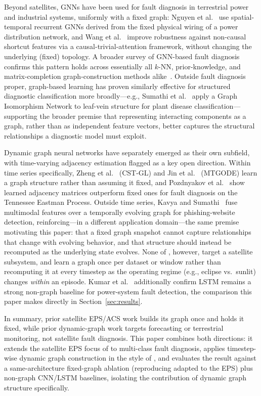 \documentclass[conference]{IEEEtran}
\begin{document}
Beyond satellites, GNNs have been used for fault diagnosis in terrestrial power and industrial
systems, uniformly with a fixed graph: Nguyen et al.~\cite{b6} use spatial-temporal recurrent
GNNs derived from the fixed physical wiring of a power distribution network, and Wang
et al.~\cite{b7} improve robustness against non-causal shortcut features via a
causal-trivial-attention framework, without changing the underlying (fixed) topology. A
broader survey of GNN-based fault diagnosis confirms this pattern holds across essentially all
$k$-NN, prior-knowledge, and matrix-completion graph-construction methods alike~\cite{b10}.
Outside fault
diagnosis proper, graph-based learning has proven similarly effective for structured
diagnostic classification more broadly---e.g., Sumathi et al.~\cite{b20} apply a Graph
Isomorphism Network to leaf-vein structure for plant disease classification---supporting the
broader premise that representing interacting components as a graph, rather than as
independent feature vectors, better captures the structural relationships a diagnostic model
must exploit.

Dynamic graph neural networks have separately emerged as their own subfield, with time-varying
adjacency estimation flagged as a key open direction. Within time series specifically,
Zheng et al.~\cite{b13} (CST-GL) and Jin et al.~\cite{b14} (MTGODE) learn a graph structure
rather than assuming it fixed, and Pozdnyakov et al.~\cite{b15} show learned adjacency
matrices outperform fixed ones for fault diagnosis on the Tennessee Eastman Process. Outside
time series, Kavya and Sumathi~\cite{b21} fuse multimodal features over a temporally evolving
graph for
phishing-website detection, reinforcing---in a different application domain---the same
premise motivating this paper: that a fixed graph snapshot cannot capture relationships that
change with evolving behavior, and that structure should instead be recomputed as the
underlying state evolves. None of
\cite{b13,b14,b15,b21}, however, target a satellite subsystem, and \cite{b13,b14}
learn a graph once per dataset or window rather than recomputing it at every timestep as the
operating regime (e.g., eclipse vs.\ sunlit) changes \emph{within} an episode. Kumar
et al.~\cite{b18} additionally confirm LSTM remains a strong non-graph baseline for
power-system fault detection, the comparison this paper makes directly in
Section~\ref{sec:results}.

In summary, prior satellite EPS/ACS work \cite{bdi,b1} builds its graph once and holds it
fixed, while prior dynamic-graph work \cite{b13,b14,b15} targets forecasting or terrestrial
monitoring, not satellite fault diagnosis. This paper combines both directions: it extends the
satellite EPS focus of \cite{bdi} to multi-class fault diagnosis, applies timestep-wise dynamic
graph construction in the style of \cite{b13,b14,b15}, and evaluates the result against a
same-architecture fixed-graph ablation (reproducing \cite{b1,b6} adapted to the EPS) plus
non-graph CNN/LSTM baselines, isolating the contribution of dynamic graph structure
specifically.
\end{document}
